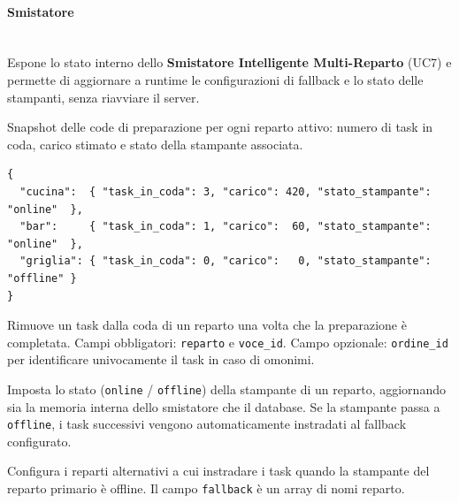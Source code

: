 \paragraph{Smistatore}\mbox{}\\

Espone lo stato interno dello \textbf{Smistatore Intelligente Multi-Reparto}
(UC7) e permette di aggiornare a runtime le configurazioni di fallback e lo stato
delle stampanti, senza riavviare il server.


Snapshot delle code di preparazione per ogni reparto attivo: numero di task in coda,
carico stimato e stato della stampante associata.

\begin{lstlisting}[style=json]
{
  "cucina":  { "task_in_coda": 3, "carico": 420, "stato_stampante": "online"  },
  "bar":     { "task_in_coda": 1, "carico":  60, "stato_stampante": "online"  },
  "griglia": { "task_in_coda": 0, "carico":   0, "stato_stampante": "offline" }
}
\end{lstlisting}


Rimuove un task dalla coda di un reparto una volta che la preparazione è completata.
Campi obbligatori: \texttt{reparto} e \texttt{voce\_id}. Campo opzionale:
\texttt{ordine\_id} per identificare univocamente il task in caso di omonimi.



Imposta lo stato (\texttt{online} / \texttt{offline}) della stampante di un reparto,
aggiornando sia la memoria interna dello smistatore che il database. Se la stampante
passa a \texttt{offline}, i task successivi vengono automaticamente instradati al
fallback configurato.



Configura i reparti alternativi a cui instradare i task quando la stampante del
reparto primario è offline. Il campo \texttt{fallback} è un array di nomi reparto.



